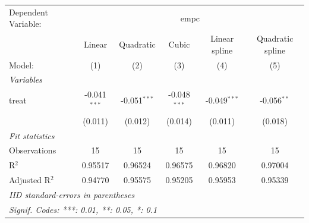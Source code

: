 
\begingroup
\centering
\begin{tabular}{lccccc}
   \tabularnewline \midrule \midrule
   Dependent Variable: & \multicolumn{5}{c}{empc}\\
                  & Linear         & Quadratic      & Cubic          & Linear spline  & Quadratic spline \\   
   Model:         & (1)            & (2)            & (3)            & (4)            & (5)\\  
   \midrule
   \emph{Variables}\\
   treat          & -0.041$^{***}$ & -0.051$^{***}$ & -0.048$^{***}$ & -0.049$^{***}$ & -0.056$^{**}$\\   
                  & (0.011)        & (0.012)        & (0.014)        & (0.011)        & (0.018)\\   
   \midrule
   \emph{Fit statistics}\\
   Observations   & 15             & 15             & 15             & 15             & 15\\  
   R$^2$          & 0.95517        & 0.96524        & 0.96575        & 0.96820        & 0.97004\\  
   Adjusted R$^2$ & 0.94770        & 0.95575        & 0.95205        & 0.95953        & 0.95339\\  
   \midrule \midrule
   \multicolumn{6}{l}{\emph{IID standard-errors in parentheses}}\\
   \multicolumn{6}{l}{\emph{Signif. Codes: ***: 0.01, **: 0.05, *: 0.1}}\\
\end{tabular}
\par\endgroup


